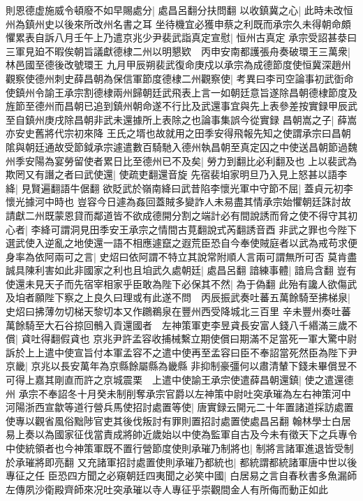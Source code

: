 則恩德虚施威令頓廢不如早賜處分|{
	處昌呂翻分扶問翻}
以收鎮冀之心|{
	此時未改恒州為鎮州史以後來所改州名書之耳}
坐待機宜必獲申蔡之利既而承宗久未得朝命頗懼累表自訴八月壬午上乃遣京兆少尹裴武詣真定宣慰|{
	恒州古真定}
承宗受詔甚㳟曰三軍見廹不暇俟朝旨議獻德棣二州以明懇欵　丙申安南都護張舟奏破環王三萬衆|{
	林邑國至德後改號環王}
九月甲辰朔裴武復命庚戍以承宗為成德節度使恒冀深趙州觀察使德州刺史薛昌朝為保信軍節度德棣二州觀察使|{
	考異曰李司空論事初武衘命使鎮州令諭王承宗割德棣兩州歸朝廷武飛表上言一如朝廷意旨遂除昌朝德棣節度及旌節至德州而昌朝已追到鎮州朝命遂不行比及武還事宜與先上表參差按實録甲辰武至自鎮州庚戌除昌朝非武未還據所上表除之也論事集誤今從實録}
昌朝嵩之子|{
	薛嵩亦安史舊將代宗初來降}
王氏之壻也故就用之田季安得飛報先知之使謂承宗曰昌朝隂與朝廷通故受節鉞承宗遽遣數百騎馳入德州執昌朝至真定囚之中使送昌朝節過魏州季安陽為宴勞留使者累日比至德州已不及矣|{
	勞力到翻比必利翻及也}
上以裴武為欺罔又有譖之者曰武使還|{
	使疏吏翻還音旋}
先宿裴垍家明旦乃入見上怒甚以語李絳|{
	見賢遍翻語牛倨翻}
欲貶武於嶺南絳曰武昔陷李懷光軍中守節不屈|{
	蓋貞元初李懷光據河中時也}
豈容今日遽為姦回蓋賊多變詐人未易盡其情承宗始懼朝廷誅討故請獻二州既蒙恩貸而鄰道皆不欲成德開分割之端計必有間說誘而脅之使不得守其初心者|{
	李絳可謂洞見田季安王承宗之情間古莧翻說式芮翻誘音酉}
非武之罪也今陛下選武使入逆亂之地使還一語不相應遽竄之遐荒臣恐自今奉使賊庭者以武為戒苟求便身率為依阿兩可之言|{
	史炤曰依阿謂不特立其說常附順人言兩可謂無所可否}
莫肯盡誠具陳利害如此非國家之利也且垍武久處朝廷|{
	處昌呂翻}
諳練事體|{
	諳烏含翻}
豈有使還未見天子而先宿宰相家乎臣敢為陛下必保其不然|{
	為于偽翻}
此殆有讒人欲傷武及垍者願陛下察之上良久曰理或有此遂不問　丙辰振武奏吐蕃五萬餘騎至拂梯泉|{
	史炤曰拂薄勿切梯天黎切本又作鸊鵜泉在豐州西受降城北三百里}
辛未豐州奏吐蕃萬餘騎至大石谷掠回鶻入貢還國者　左神策軍吏李昱貣長安富人錢八千緡滿三歲不償|{
	貣吐得翻假貣也}
京兆尹許孟容收捕械繫立期使償曰期滿不足當死一軍大驚中尉訴於上上遣中使宣旨付本軍孟容不之遣中使再至孟容曰臣不奉詔當死然臣為陛下尹京畿|{
	京兆以長安萬年為京縣餘屬縣為畿縣}
非抑制豪彊何以肅清輦下錢未畢償昱不可得上嘉其剛直而許之京城震栗　上遣中使諭王承宗使遣薛昌朝還鎮|{
	使之遣還德州}
承宗不奉詔冬十月癸未制削奪承宗官爵以左神策中尉吐突承璀為左右神策河中河陽浙西宣歙等道行營兵馬使招討處置等使|{
	唐實録云開元二十年置諸道採訪處置使專以觀省風俗黜陟官吏其後伐叛討有罪則置招討處置使處昌呂翻}
翰林學士白居易上奏以為國家征伐當責成將帥近歲始以中使為監軍自古及今未有徵天下之兵專令中使統領者也今神策軍既不置行營節度使則承璀乃制將也|{
	制將言諸軍進退皆受制於承璀將即亮翻}
又充諸軍招討處置使則承璀乃都統也|{
	都統謂都統諸軍唐中世以後專征之任}
臣恐四方聞之必窺朝廷四夷聞之必笑中國|{
	白居易之言自春秋書多魚漏師左傳夙沙衛殿齊師來况吐突承璀以寺人專征乎崇觀間金人有所侮而動正如此}
